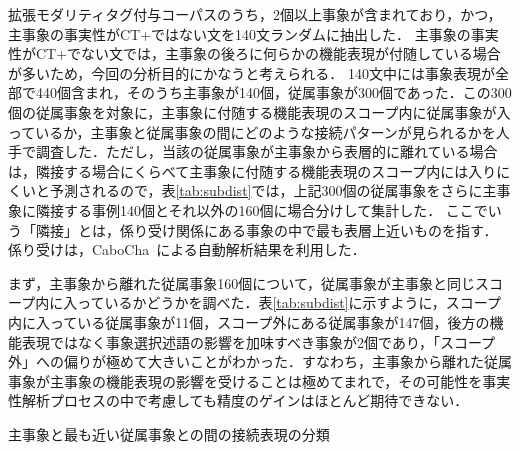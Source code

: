 \documentclass[japanese]{jnlp_1.4}
\begin{document}
拡張モダリティタグ付与コーパスのうち，2個以上事象が含まれており，かつ，主事象の事実性がCT+ではない文を140文ランダムに抽出した．
主事象の事実性がCT+でない文では，主事象の後ろに何らかの機能表現が付随している場合が多いため，今回の分析目的にかなうと考えられる．
140文中には事象表現が全部で440個含まれ，そのうち主事象が140個，従属事象が300個であった．この300個の従属事象を対象に，主事象に付随する機能表現のスコープ内に従属事象が入っているか，主事象と従属事象の間にどのような接続パターンが見られるかを人手で調査した．ただし，当該の従属事象が主事象から表層的に離れている場合は，隣接する場合にくらべて主事象に付随する機能表現のスコープ内には入りにくいと予測されるので，表\ref{tab:subdist}では，上記300個の従属事象をさらに主事象に隣接する事例140個とそれ以外の160個に場合分けして集計した．
ここでいう「隣接」とは，係り受け関係にある事象の中で最も表層上近いものを指す．
係り受けは，CaboCha~\cite{CaboCha}による自動解析結果を利用した．

まず，主事象から離れた従属事象160個について，従属事象が主事象と同じスコープ内に入っているかどうかを調べた．表\ref{tab:subdist}に示すように，スコープ内に入っている従属事象が11個，スコープ外にある従属事象が147個，後方の機能表現ではなく事象選択述語の影響を加味すべき事象が2個であり，「スコープ外」への偏りが極めて大きいことがわかった．すなわち，主事象から離れた従属事象が主事象の機能表現の影響を受けることは極めてまれで，その可能性を事実性解析プロセスの中で考慮しても精度のゲインはほとんど期待できない．

\begin{table}[b]
\vspace{-0.5\Cvs}
\caption{主事象と最も近い従属事象との間の接続表現の分類}
\label{tab:scope:add}

\end{table}
\end{document}
